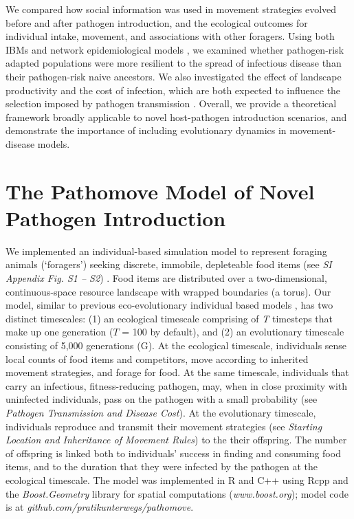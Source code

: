 We compared how social information was used in movement strategies evolved before and after pathogen introduction, and the ecological outcomes for individual intake, movement, and associations with other foragers.
Using both IBMs and network epidemiological models \autocite{wilber2022,stroeymeyt2018,white2017,bailey1975}, we examined whether pathogen-risk adapted populations were more resilient to the spread of infectious disease than their pathogen-risk naive ancestors.
We also investigated the effect of landscape productivity and the cost of infection, which are both expected to influence the selection imposed by pathogen transmission \autocite{ezenwa2016,almberg2015,hutchings2000}.
Overall, we provide a theoretical framework broadly applicable to novel host-pathogen introduction scenarios, and demonstrate the importance of including evolutionary dynamics in movement-disease models.

\section*{The Pathomove Model of Novel Pathogen Introduction}

We implemented an individual-based simulation model to represent foraging animals (`foragers') seeking discrete, immobile, depleteable food items (see \textit{SI Appendix Fig. S1 -- S2}) \autocite{spiegel2017,gupte2021a}.
Food items are distributed over a two-dimensional, continuous-space resource landscape with wrapped boundaries (a torus).
Our model, similar to previous eco-evolutionary individual based models \autocite{getz2015, netz2021, gupte2021a}, has two distinct timescales: (1) an ecological timescale comprising of \textit{T} timesteps that make up one generation ($T$ = 100 by default), and (2) an evolutionary timescale consisting of 5,000 generations (G).
At the ecological timescale, individuals sense local counts of food items and competitors, move according to inherited movement strategies, and forage for food.
At the same timescale, individuals that carry an infectious, fitness-reducing pathogen, may, when in close proximity with uninfected individuals, pass on the pathogen with a small probability (see \textit{Pathogen Transmission and Disease Cost}).
At the evolutionary timescale, individuals reproduce and transmit their movement strategies (see \textit{Starting Location and Inheritance of Movement Rules}) to the their offspring. The number of offspring is linked both to individuals' success in finding and consuming food items, and to the duration that they were infected by the pathogen at the ecological timescale.
The model was implemented in R and C++ using Rcpp \autocite{rcoreteam2020,eddelbuettel2013} and the \textit{Boost.Geometry} library for spatial computations (\textit{www.boost.org}); model code is at \textit{github.com/pratikunterwegs/pathomove}.


